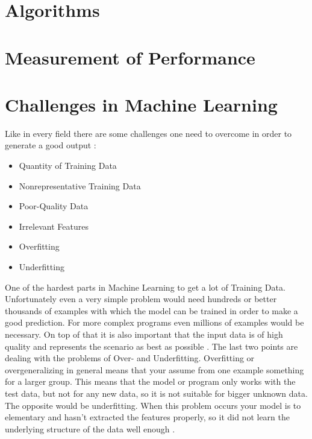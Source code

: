 \documentclass[notitlepage,english]{hgbreport}
\begin{document}
\section{Algorithms}
\label{sec:algorithms}



\section{Measurement of Performance}
\label{sec:MeasurementofPerformance}


\section{Challenges in Machine Learning}

Like in every field there are some challenges one need to overcome in order to generate a good output \cite{geron2017hands}:
\begin{itemize}
\item Quantity of Training Data
\item Nonrepresentative Training Data
\item Poor-Quality Data
\item Irrelevant Features
\item Overfitting
\item Underfitting 
\end{itemize}
\bigskip
One of the hardest parts in Machine Learning to get a lot of Training Data. Unfortunately even a very simple problem would need hundreds or better thousands of examples with which the model can be trained in order to make a good prediction. For more complex programs even millions of examples would be necessary. On top of that it is also important that the input data is of high quality and represents the scenario as best as possible \cite{geron2017hands}. 
\newline \newline
The last two points are dealing with the problems of Over- and Underfitting. Overfitting or overgeneralizing in general means that your assume from one example something for a larger group. This means that the model or program only works with the test data, but not for any new data, so it is not suitable for bigger unknown data. The opposite would be underfitting. When this problem occurs your model is to elementary and hasn't extracted the features properly, so it did not learn the underlying structure of the data well enough \cite{geron2017hands}.
\end{document}
